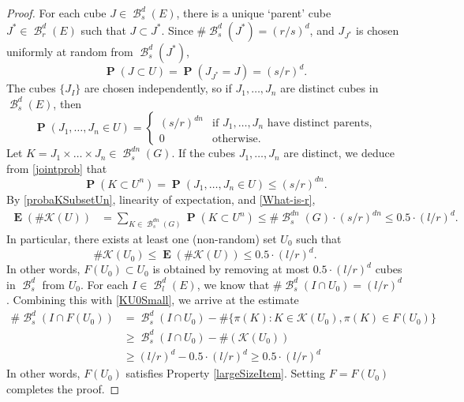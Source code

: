 \documentclass[dvipsnames,letterpaper,12pt]{article}
\numberwithin{equation}{section}
\theoremstyle{plain}
\theoremstyle{remark}
\DeclareMathOperator{\prob}{\mathbf{P}}
\DeclareMathOperator{\expect}{\mathbf{E}}
\DeclareMathOperator{\setcolon}{\colon}
\DeclareMathOperator{\B}{\mathcal{B}}
\begin{document}
\begin{proof}
	For each cube $J \in \B_s^d(E)$, there is a unique `parent' cube $J^* \in \B_r^d(E)$ such that $J \subset J^*$. Since $\# \B^d_s(J^*) = (r/s)^d$, and $J_{J^*}$ is chosen uniformly at random from $\B^d_s(J^*)$,
	\[ \prob(J \subset U) = \prob(J_{J^*} = J) = (s/r)^d. \]
	The cubes $\{ J_I \}$ are chosen independently, so if $J_1, \dots, J_n$ are distinct cubes in $\B^d_s(E)$, then 
	\begin{equation}\label{jointprob}
	\prob(J_1, \dots, J_n \in U) = \begin{cases} (s/r)^{dn} & \text{if $J_1, \dots, J_n$ have distinct parents,} \\ 0 & \text{otherwise}. \end{cases} 
	\end{equation}
	Let $K = J_1 \times \dots \times J_n \in \B^{dn}_s(G)$. If the cubes $J_1, \dots, J_n$ are distinct, we deduce from \eqref{jointprob} that
	\begin{equation}\label{probaKSubsetUn}
		\prob(K \subset U^n) = \prob(J_1, \dots, J_n \in U) \leq (s/r)^{dn}.
	\end{equation}
	By \eqref{probaKSubsetUn}, linearity of expectation, and \eqref{What-is-r},
	\begin{align*}
		\expect(\# \mathcal{K}(U)) &= \sum_{K \in \B^{dn}_s(G)} \prob(K \subset U^n) \leq \# \B_s^{dn}(G) \cdot (s/r)^{dn}
		\leq 0.5 \cdot (l/r)^d.
	\end{align*}
	In particular, there exists at least one (non-random) set $U_0$ such that
	\begin{equation}\label{KU0Small}
		\# \mathcal{K}(U_0) \leq \expect(\# \mathcal{K}(U)) \leq 0.5 \cdot (l/r)^d.
	\end{equation}
	 In other words, $F(U_0) \subset U_0$ is obtained by removing at most $0.5 \cdot (l/r)^d$ cubes in $\B^d_s$ from $U_0$. For each $I \in \B_l^d(E)$, we know that $\# \B_{s}^d(I \cap U_0) = (l/r)^d$. Combining this with \eqref{KU0Small}, we arrive at the estimate 
	\begin{align*}
		\# \B_s^d(I \cap F(U_0)) &= \B_s^d(I \cap U_0) - \# \{ \pi(K) \setcolon K \in \mathcal{K}(U_0), \pi(K) \in F(U_0) \}\\
		&\geq \B_s^d(I \cap U_0) - \#(\mathcal{K}(U_0))\\
		&\geq (l/r)^d - 0.5 \cdot (l/r)^d \geq 0.5 \cdot (l/r)^d
	\end{align*}  
	In other words, $F(U_0)$ satisfies Property \ref{largeSizeItem}. Setting $F = F(U_0)$ completes the proof.
\end{proof}
\end{document}
